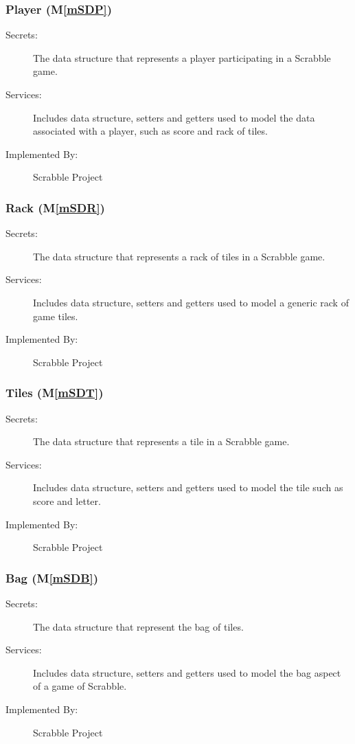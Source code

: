 \documentclass[12pt, titlepage]{article}
\newcommand{\mref}[1]{M\ref{#1}}
\begin{document}
\subsubsection{Player (\mref{mSDP})}
\begin{description}
\item[Secrets:] The data structure that represents a player participating in a Scrabble game.
\item[Services:] Includes data structure, setters and getters used to model the data associated with a player, such as score and rack of tiles.
\item[Implemented By:] Scrabble Project
\end{description}

\subsubsection{Rack (\mref{mSDR})}
\begin{description}
\item[Secrets:] The data structure that represents a rack of tiles in a Scrabble game.
\item[Services:] Includes data structure, setters and getters used to model a generic rack of game tiles. 
\item[Implemented By:] Scrabble Project
\end{description}

\subsubsection{Tiles (\mref{mSDT})}
\begin{description}
\item[Secrets:] The data structure that represents a tile in a Scrabble game.
\item[Services:] Includes data structure, setters and getters used to model the tile such as score and letter.
\item[Implemented By:] Scrabble Project
\end{description}

\subsubsection{Bag (\mref{mSDB})}
\begin{description}
\item[Secrets:] The data structure that represent the bag of tiles.
\item[Services:] Includes data structure, setters and getters used to model the bag aspect of a game of Scrabble.
\item[Implemented By:] Scrabble Project
\end{description}
\end{document}
